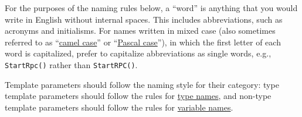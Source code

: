 For the purposes of the naming rules below, a \enquote{word} is anything that you would write in English without internal spaces. This includes abbreviations, such as acronyms and initialisms. For names written in mixed case (also sometimes referred to as \enquote{\href{https://en.wikipedia.org/wiki/Camel_case}{camel case}} or \enquote{\href{https://en.wiktionary.org/wiki/Pascal_case}{Pascal case}}), in which the first letter of each word is capitalized, prefer to capitalize abbreviations as single words, e.g., \texttt{StartRpc()} rather than \texttt{StartRPC()}.

Template parameters should follow the naming style for their category: type template parameters should follow the rules for \hyperref[sec:type-names]{type names}, and non-type template parameters should follow the rules for \hyperref[sec:variable-names]{variable names}.
